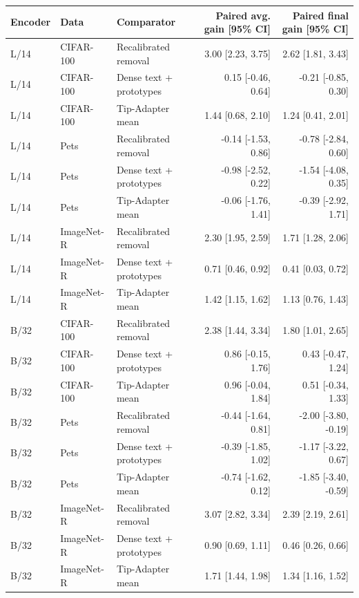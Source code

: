 \begin{tabular}{lllrr}
\toprule
Encoder & Data & Comparator & Paired avg. gain [95\% CI] & Paired final gain [95\% CI] \\
\midrule
L/14 & CIFAR-100 & Recalibrated removal & 3.00 [2.23, 3.75] & 2.62 [1.81, 3.43] \\
L/14 & CIFAR-100 & Dense text + prototypes & 0.15 [-0.46, 0.64] & -0.21 [-0.85, 0.30] \\
L/14 & CIFAR-100 & Tip-Adapter mean & 1.44 [0.68, 2.10] & 1.24 [0.41, 2.01] \\
L/14 & Pets & Recalibrated removal & -0.14 [-1.53, 0.86] & -0.78 [-2.84, 0.60] \\
L/14 & Pets & Dense text + prototypes & -0.98 [-2.52, 0.22] & -1.54 [-4.08, 0.35] \\
L/14 & Pets & Tip-Adapter mean & -0.06 [-1.76, 1.41] & -0.39 [-2.92, 1.71] \\
L/14 & ImageNet-R & Recalibrated removal & 2.30 [1.95, 2.59] & 1.71 [1.28, 2.06] \\
L/14 & ImageNet-R & Dense text + prototypes & 0.71 [0.46, 0.92] & 0.41 [0.03, 0.72] \\
L/14 & ImageNet-R & Tip-Adapter mean & 1.42 [1.15, 1.62] & 1.13 [0.76, 1.43] \\
\midrule
B/32 & CIFAR-100 & Recalibrated removal & 2.38 [1.44, 3.34] & 1.80 [1.01, 2.65] \\
B/32 & CIFAR-100 & Dense text + prototypes & 0.86 [-0.15, 1.76] & 0.43 [-0.47, 1.24] \\
B/32 & CIFAR-100 & Tip-Adapter mean & 0.96 [-0.04, 1.84] & 0.51 [-0.34, 1.33] \\
B/32 & Pets & Recalibrated removal & -0.44 [-1.64, 0.81] & -2.00 [-3.80, -0.19] \\
B/32 & Pets & Dense text + prototypes & -0.39 [-1.85, 1.02] & -1.17 [-3.22, 0.67] \\
B/32 & Pets & Tip-Adapter mean & -0.74 [-1.62, 0.12] & -1.85 [-3.40, -0.59] \\
B/32 & ImageNet-R & Recalibrated removal & 3.07 [2.82, 3.34] & 2.39 [2.19, 2.61] \\
B/32 & ImageNet-R & Dense text + prototypes & 0.90 [0.69, 1.11] & 0.46 [0.26, 0.66] \\
B/32 & ImageNet-R & Tip-Adapter mean & 1.71 [1.44, 1.98] & 1.34 [1.16, 1.52] \\
\bottomrule
\end{tabular}
